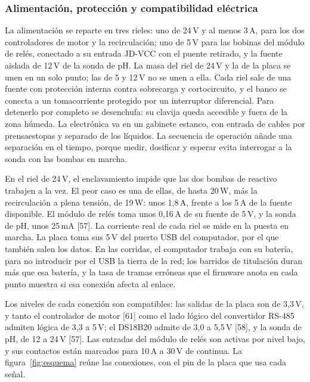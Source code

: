 \subsubsection{Alimentación, protección y compatibilidad eléctrica}\label{sec:alim}
La alimentación se reparte en tres rieles: uno de 24\,V y al menos 3\,A, para los dos controladores de motor y la recirculación; uno de 5\,V para las bobinas del módulo de relés, conectado a su entrada JD-VCC con el puente retirado, y la fuente aislada de 12\,V de la sonda de pH. La masa del riel de 24\,V y la de la placa se unen en un solo punto; las de 5 y 12\,V no se unen a ella. Cada riel sale de una fuente con protección interna contra sobrecarga y cortocircuito, y el banco se conecta a un tomacorriente protegido por un interruptor diferencial. Para detenerlo por completo se desenchufa: su clavija queda accesible y fuera de la zona húmeda. La electrónica va en un gabinete estanco, con entrada de cables por prensaestopas y separado de los líquidos. La secuencia de operación añade una separación en el tiempo, porque medir, dosificar y esperar evita interrogar a la sonda con las bombas en marcha.

En el riel de 24\,V, el enclavamiento impide que las dos bombas de reactivo trabajen a la vez. El peor caso es una de ellas, de hasta 20\,W, más la recirculación a plena tensión, de 19\,W: unos 1,8\,A, frente a los 5\,A de la fuente disponible. El módulo de relés toma unos 0,16\,A de su fuente de 5\,V, y la sonda de pH, unos 25\,mA [57]. La corriente real de cada riel se mide en la puesta en marcha. La placa toma sus 5\,V del puerto USB del computador, por el que también salen los datos. En las corridas, el computador trabaja con su batería, para no introducir por el USB la tierra de la red; los barridos de titulación duran más que esa batería, y la tasa de tramas erróneas que el firmware anota en cada punto muestra si esa conexión afecta al enlace.

Los niveles de cada conexión son compatibles: las salidas de la placa son de 3,3\,V, y tanto el controlador de motor [61] como el lado lógico del convertidor RS-485 admiten lógica de 3,3 a 5\,V; el DS18B20 admite de 3,0 a 5,5\,V [58], y la sonda de pH, de 12 a 24\,V [57]. Las entradas del módulo de relés son activas por nivel bajo, y sus contactos están marcados para 10\,A a 30\,V de continua. La figura~\ref{fig:esquema} reúne las conexiones, con el pin de la placa que usa cada señal.


